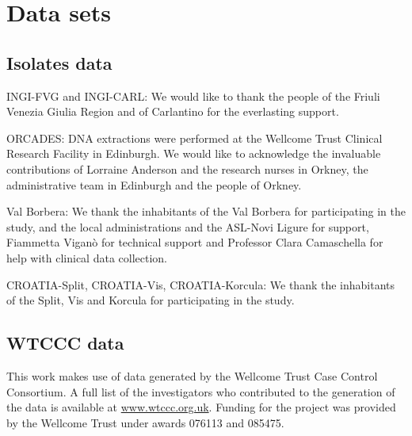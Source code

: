 \chapter{Data sets}


\section*{Isolates data}
INGI-FVG and INGI-CARL: We would like to thank the people of the Friuli Venezia Giulia Region and of Carlantino for the everlasting support.

ORCADES: DNA extractions were performed at the Wellcome Trust Clinical Research Facility in Edinburgh. We would like to acknowledge the invaluable contributions of Lorraine Anderson and the research nurses in Orkney, the administrative team in Edinburgh and the people of Orkney.

Val Borbera: We thank the inhabitants of the Val Borbera for participating in the study, and the local administrations and the ASL-Novi Ligure for support, Fiammetta Vigan\`{o} for technical support and Professor Clara Camaschella for help with clinical data collection. 

CROATIA-Split, CROATIA-Vis, CROATIA-Korcula: We thank the inhabitants of the Split, Vis and Korcula for participating in the study.


\section*{WTCCC data}
This work makes use of data generated by the Wellcome Trust Case Control Consortium. A full list of the investigators who contributed to the generation of the data is available at \url{www.wtccc.org.uk}. Funding for the project was provided by the Wellcome Trust under awards 076113 and 085475.
